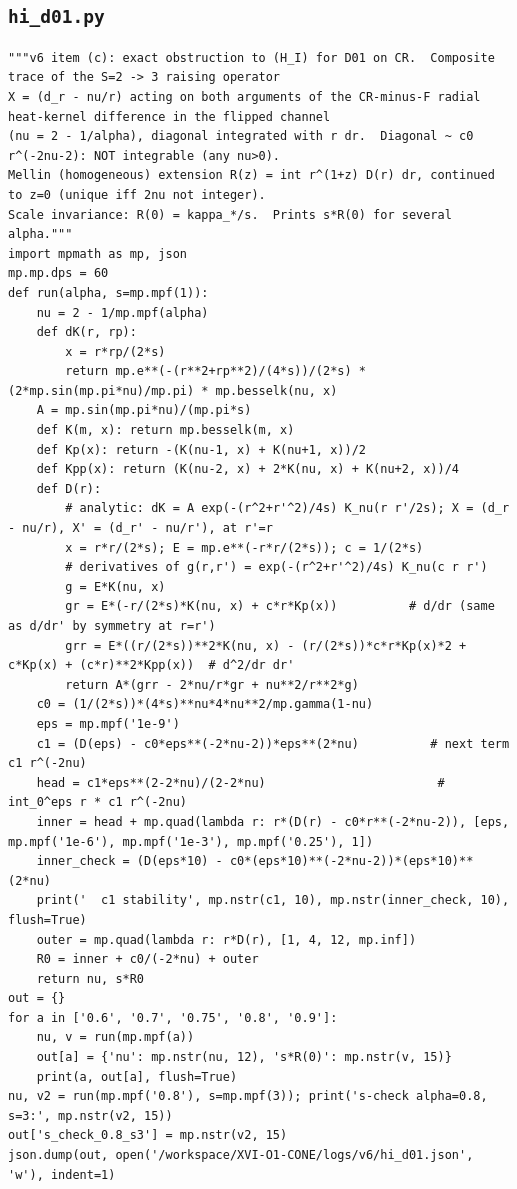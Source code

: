 \documentclass[10pt]{article}
\begin{document}
\subsection{\texttt{hi\_d01.py}}
\begin{lstlisting}
"""v6 item (c): exact obstruction to (H_I) for D01 on CR.  Composite trace of the S=2 -> 3 raising operator
X = (d_r - nu/r) acting on both arguments of the CR-minus-F radial heat-kernel difference in the flipped channel
(nu = 2 - 1/alpha), diagonal integrated with r dr.  Diagonal ~ c0 r^(-2nu-2): NOT integrable (any nu>0).
Mellin (homogeneous) extension R(z) = int r^(1+z) D(r) dr, continued to z=0 (unique iff 2nu not integer).
Scale invariance: R(0) = kappa_*/s.  Prints s*R(0) for several alpha."""
import mpmath as mp, json
mp.mp.dps = 60
def run(alpha, s=mp.mpf(1)):
    nu = 2 - 1/mp.mpf(alpha)
    def dK(r, rp):
        x = r*rp/(2*s)
        return mp.e**(-(r**2+rp**2)/(4*s))/(2*s) * (2*mp.sin(mp.pi*nu)/mp.pi) * mp.besselk(nu, x)
    A = mp.sin(mp.pi*nu)/(mp.pi*s)
    def K(m, x): return mp.besselk(m, x)
    def Kp(x): return -(K(nu-1, x) + K(nu+1, x))/2
    def Kpp(x): return (K(nu-2, x) + 2*K(nu, x) + K(nu+2, x))/4
    def D(r):
        # analytic: dK = A exp(-(r^2+r'^2)/4s) K_nu(r r'/2s); X = (d_r - nu/r), X' = (d_r' - nu/r'), at r'=r
        x = r*r/(2*s); E = mp.e**(-r*r/(2*s)); c = 1/(2*s)
        # derivatives of g(r,r') = exp(-(r^2+r'^2)/4s) K_nu(c r r')
        g = E*K(nu, x)
        gr = E*(-r/(2*s)*K(nu, x) + c*r*Kp(x))          # d/dr (same as d/dr' by symmetry at r=r')
        grr = E*((r/(2*s))**2*K(nu, x) - (r/(2*s))*c*r*Kp(x)*2 + c*Kp(x) + (c*r)**2*Kpp(x))  # d^2/dr dr'
        return A*(grr - 2*nu/r*gr + nu**2/r**2*g)
    c0 = (1/(2*s))*(4*s)**nu*4*nu**2/mp.gamma(1-nu)
    eps = mp.mpf('1e-9')
    c1 = (D(eps) - c0*eps**(-2*nu-2))*eps**(2*nu)          # next term c1 r^(-2nu)
    head = c1*eps**(2-2*nu)/(2-2*nu)                        # int_0^eps r * c1 r^(-2nu)
    inner = head + mp.quad(lambda r: r*(D(r) - c0*r**(-2*nu-2)), [eps, mp.mpf('1e-6'), mp.mpf('1e-3'), mp.mpf('0.25'), 1])
    inner_check = (D(eps*10) - c0*(eps*10)**(-2*nu-2))*(eps*10)**(2*nu)
    print('  c1 stability', mp.nstr(c1, 10), mp.nstr(inner_check, 10), flush=True)
    outer = mp.quad(lambda r: r*D(r), [1, 4, 12, mp.inf])
    R0 = inner + c0/(-2*nu) + outer
    return nu, s*R0
out = {}
for a in ['0.6', '0.7', '0.75', '0.8', '0.9']:
    nu, v = run(mp.mpf(a))
    out[a] = {'nu': mp.nstr(nu, 12), 's*R(0)': mp.nstr(v, 15)}
    print(a, out[a], flush=True)
nu, v2 = run(mp.mpf('0.8'), s=mp.mpf(3)); print('s-check alpha=0.8, s=3:', mp.nstr(v2, 15))
out['s_check_0.8_s3'] = mp.nstr(v2, 15)
json.dump(out, open('/workspace/XVI-O1-CONE/logs/v6/hi_d01.json', 'w'), indent=1)
\end{lstlisting}
\end{document}
